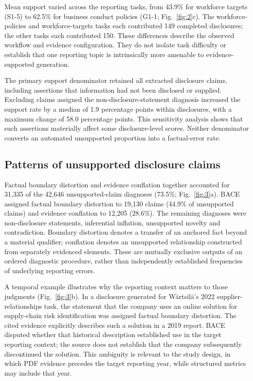 \documentclass[11pt,a4paper]{article}
\begin{document}
Mean support varied across the reporting tasks, from 43.9\% for workforce targets (S1-5) to 62.5\% for business conduct policies (G1-1; Fig.~\ref{fig:2}c). The workforce-policies and workforce-targets tasks each contributed 149 completed disclosures; the other tasks each contributed 150. These differences describe the observed workflow and evidence configuration. They do not isolate task difficulty or establish that one reporting topic is intrinsically more amenable to evidence-supported generation.

The primary support denominator retained all extracted disclosure claims, including assertions that information had not been disclosed or supplied. Excluding claims assigned the non-disclosure-statement diagnosis increased the support rate by a median of 1.9 percentage points within disclosures, with a maximum change of 58.0 percentage points. This sensitivity analysis shows that such assertions materially affect some disclosure-level scores. Neither denominator converts an automated unsupported proportion into a factual-error rate.

\subsection*{Patterns of unsupported disclosure claims}

Factual boundary distortion and evidence conflation together accounted for 31,335 of the 42,646 unsupported-claim diagnoses (73.5\%; Fig.~\ref{fig:3}a). BACE assigned factual boundary distortion to 19,130 claims (44.9\% of unsupported claims) and evidence conflation to 12,205 (28.6\%). The remaining diagnoses were non-disclosure statements, inferential inflation, unsupported novelty and contradiction. Boundary distortion denotes a transfer of an anchored fact beyond a material qualifier; conflation denotes an unsupported relationship constructed from separately evidenced elements. These are mutually exclusive outputs of an ordered diagnostic procedure, rather than independently established frequencies of underlying reporting errors.

A temporal example illustrates why the reporting context matters to those judgments (Fig.~\ref{fig:3}b). In a disclosure generated for Wärtsilä's 2022 supplier-relationships task, the statement that the company uses an online solution for supply-chain risk identification was assigned factual boundary distortion. The cited evidence explicitly describes such a solution in a 2019 report. BACE disputed whether that historical description established use in the target reporting context; the source does not establish that the company subsequently discontinued the solution. This ambiguity is relevant to the study design, in which PDF evidence precedes the target reporting year, while structured metrics may include that year.
\end{document}
